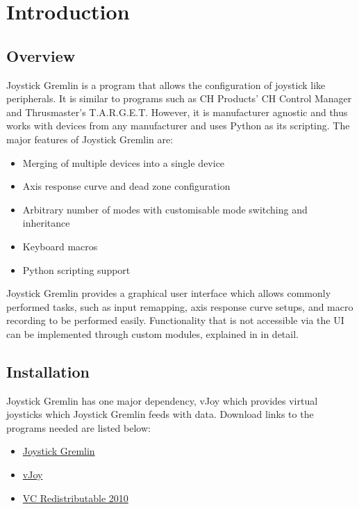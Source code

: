 \documentclass[a4, 10pt]{article}
\newcommand{\JG}{Joystick Gremlin}
\begin{document}


\tableofcontents
\newpage


\section{Introduction}
\label{sec:introduction}


\subsection{Overview}

\JG{} is a program that allows the configuration of joystick like
peripherals. It is similar to programs such as CH Products' CH Control
Manager and Thrusmaster's T.A.R.G.E.T. However, it is manufacturer
agnostic and thus works with devices from any manufacturer and uses
Python as its scripting. The major features of Joystick Gremlin are:
\begin{itemize}
    \item Merging of multiple devices into a single device
    \item Axis response curve and dead zone configuration
    \item Arbitrary number of modes with customisable mode switching and
        inheritance
    \item Keyboard macros
    \item Python scripting support
\end{itemize}

\JG{} provides a graphical user interface which allows commonly
performed tasks, such as input remapping, axis response curve setups,
and macro recording to be performed easily. Functionality that is not
accessible via the UI can be implemented through custom modules,
explained in  in detail.


\subsection{Installation}
\JG{} has one major dependency, vJoy which provides virtual joysticks
which \JG{} feeds with data. Download links to the programs needed are
listed below:
\begin{itemize}
    \item \href{https://github.com/WhiteMagic/JoystickGremlin}{\JG{}}
    \item \href{http://vjoystick.sourceforge.net/site/}{vJoy}
    \item
        \href{http://www.microsoft.com/en-us/download/details.aspx?id=5555}{VC
        Redistributable 2010}
\end{itemize}
\end{document}
